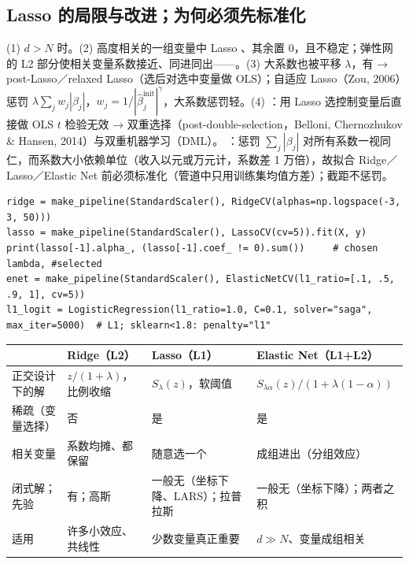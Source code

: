 \subsection{Lasso 的局限与改进；为何必须先标准化}
(1) $d>N$ 时。(2) 高度相关的一组变量中 Lasso 、其余置 0，且不稳定；弹性网的 L2 部分使相关变量系数接近、同进同出——。(3) 大系数也被平移 $\lambda$，有 → post-Lasso／relaxed Lasso（选后对选中变量做 OLS）；自适应 Lasso（Zou, 2006）惩罚 $\lambda\sum_jw_j|\beta_j|$，$w_j=1/|\hat\beta_j^{\text{init}}|^\gamma$，大系数惩罚轻。(4) ：用 Lasso 选控制变量后直接做 OLS $t$ 检验无效 → 双重选择（post-double-selection，Belloni, Chernozhukov \& Hansen, 2014）与双重机器学习（DML）。
：惩罚 $\sum_j|\beta_j|$ 对所有系数一视同仁，而系数大小依赖单位（收入以元或万元计，系数差 1 万倍），故拟合 Ridge／Lasso／Elastic Net 前必须标准化（管道中只用训练集均值方差）；截距不惩罚。
\begin{lstlisting}[basicstyle=\ttfamily\footnotesize]
ridge = make_pipeline(StandardScaler(), RidgeCV(alphas=np.logspace(-3, 3, 50)))
lasso = make_pipeline(StandardScaler(), LassoCV(cv=5)).fit(X, y)
print(lasso[-1].alpha_, (lasso[-1].coef_ != 0).sum())     # chosen lambda, #selected
enet = make_pipeline(StandardScaler(), ElasticNetCV(l1_ratio=[.1, .5, .9, 1], cv=5))
l1_logit = LogisticRegression(l1_ratio=1.0, C=0.1, solver="saga", max_iter=5000)  # L1; sklearn<1.8: penalty="l1"
\end{lstlisting}
\begin{center}\small\renewcommand{\arraystretch}{1.1}
\begin{tabularx}{\linewidth}{@{}p{2.4cm}p{3.3cm}p{5.2cm}L@{}}
\toprule
 & Ridge（L2）& Lasso（L1）& Elastic Net（L1+L2）\\
\midrule
正交设计下的解 & $z/(1+\lambda)$，比例收缩 & $S_\lambda(z)$，软阈值 & $S_{\lambda\alpha}(z)/(1+\lambda(1-\alpha))$ \\
稀疏（变量选择）& 否 & 是 & 是 \\
相关变量 & 系数均摊、都保留 & 随意选一个 & 成组进出（分组效应）\\
闭式解；先验 & 有；高斯 & 一般无（坐标下降、LARS）；拉普拉斯 & 一般无（坐标下降）；两者之积 \\
适用 & 许多小效应、共线性 & 少数变量真正重要 & $d\gg N$、变量成组相关 \\
\bottomrule
\end{tabularx}
\end{center}

